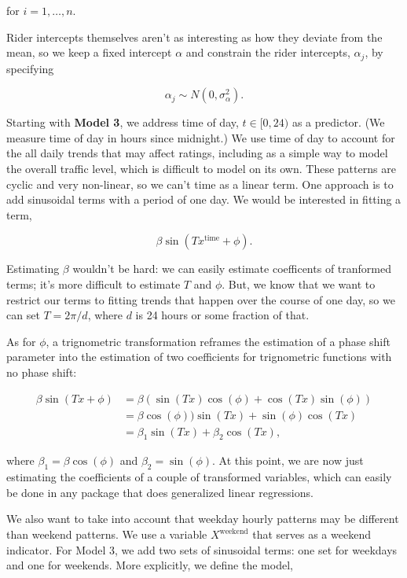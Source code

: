 \documentclass[]{article}
\begin{document}
for \(i = 1, \ldots, n\).

Rider intercepts themselves aren't as interesting as how they deviate
from the mean, so we keep a fixed intercept \(\alpha\) and constrain the
rider intercepts, \(\alpha_j\), by specifying

\[\alpha_j \sim N(0, \sigma^2_\alpha).\]

Starting with \textbf{Model 3}, we address time of day,
\(t \in [0, 24)\) as a predictor. (We measure time of day in hours since
midnight.) We use time of day to account for the all daily trends that
may affect ratings, including as a simple way to model the overall
traffic level, which is difficult to model on its own. These patterns
are cyclic and very non-linear, so we can't time as a linear term. One
approach is to add sinusoidal terms with a period of one day. We would
be interested in fitting a term,

\[\beta \sin (T x^{\text{time}} + \phi).\]

Estimating \(\beta\) wouldn't be hard: we can easily estimate
coefficents of tranformed terms; it's more difficult to estimate \(T\)
and \(\phi\). But, we know that we want to restrict our terms to fitting
trends that happen over the course of one day, so we can set
\(T = 2 \pi / d\), where \(d\) is 24 hours or some fraction of that.

As for \(\phi\), a trignometric transformation reframes the estimation
of a phase shift parameter into the estimation of two coefficients for
trignometric functions with no phase shift:

\begin{align*}
\beta \sin (T x + \phi) &= 
\beta \left( \sin (T x) \cos (\phi) + \cos (T x) \sin (\phi) \right)\\
&= \beta \cos (\phi)) \sin (T x) + \sin (\phi) \cos (T x)\\
&= \beta_1 \sin (T x) + \beta_2 \cos (T x),
\end{align*}

where \(\beta_1 = \beta \cos (\phi)\) and \(\beta_2 = \sin (\phi).\) At
this point, we are now just estimating the coefficients of a couple of
transformed variables, which can easily be done in any package that does
generalized linear regressions.

We also want to take into account that weekday hourly patterns may be
different than weekend patterns. We use a variable \(X^\text{weekend}\)
that serves as a weekend indicator. For Model 3, we add two sets of
sinusoidal terms: one set for weekdays and one for weekends. More
explicitly, we define the model,
\end{document}
